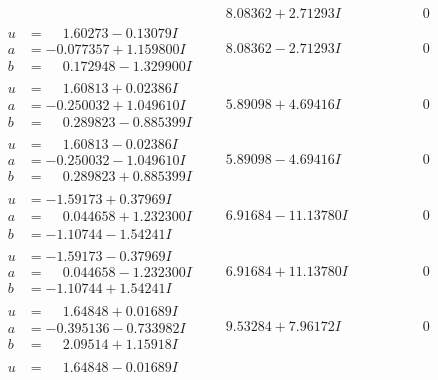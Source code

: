\documentclass[1p]{elsarticle_modified}
\theoremstyle{definition}
\begin{document}
$$\begin{array}{c|c|c}
 & \phantom{-}8.08362 + 2.71293 I & \phantom{-0.000000 } 0 \\ \hline\begin{aligned}
u &= \phantom{-}1.60273 - 0.13079 I \\
a &= -0.077357 + 1.159800 I \\
b &= \phantom{-}0.172948 - 1.329900 I\end{aligned}
 & \phantom{-}8.08362 - 2.71293 I & \phantom{-0.000000 } 0 \\ \hline\begin{aligned}
u &= \phantom{-}1.60813 + 0.02386 I \\
a &= -0.250032 + 1.049610 I \\
b &= \phantom{-}0.289823 - 0.885399 I\end{aligned}
 & \phantom{-}5.89098 + 4.69416 I & \phantom{-0.000000 } 0 \\ \hline\begin{aligned}
u &= \phantom{-}1.60813 - 0.02386 I \\
a &= -0.250032 - 1.049610 I \\
b &= \phantom{-}0.289823 + 0.885399 I\end{aligned}
 & \phantom{-}5.89098 - 4.69416 I & \phantom{-0.000000 } 0 \\ \hline\begin{aligned}
u &= -1.59173 + 0.37969 I \\
a &= \phantom{-}0.044658 + 1.232300 I \\
b &= -1.10744 - 1.54241 I\end{aligned}
 & \phantom{-}6.91684 - 11.13780 I & \phantom{-0.000000 } 0 \\ \hline\begin{aligned}
u &= -1.59173 - 0.37969 I \\
a &= \phantom{-}0.044658 - 1.232300 I \\
b &= -1.10744 + 1.54241 I\end{aligned}
 & \phantom{-}6.91684 + 11.13780 I & \phantom{-0.000000 } 0 \\ \hline\begin{aligned}
u &= \phantom{-}1.64848 + 0.01689 I \\
a &= -0.395136 - 0.733982 I \\
b &= \phantom{-}2.09514 + 1.15918 I\end{aligned}
 & \phantom{-}9.53284 + 7.96172 I & \phantom{-0.000000 } 0 \\ \hline\begin{aligned}
u &= \phantom{-}1.64848 - 0.01689 I \\

\end{aligned}
\end{array}$$
\end{document}
